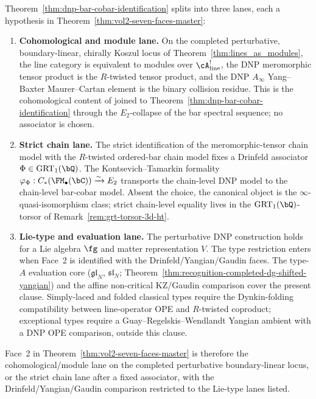 \begin{remark}
\label{rem:dnp-identification-lanes}
Theorem~\ref{thm:dnp-bar-cobar-identification} splits into three
lanes, each a hypothesis in
Theorem~\ref{thm:vol2-seven-faces-master}:
\begin{enumerate}[label=\textup{(\roman*)}]
\item \textbf{Cohomological and module lane.}
On the completed perturbative, boundary-linear, chirally Koszul
locus of Theorem~\ref{thm:lines_as_modules}, the line category is
equivalent to modules over $\cA^!_{\mathrm{line}}$, the DNP
meromorphic tensor product is the $R$-twisted tensor product, and
the DNP $A_\infty$ Yang--Baxter Maurer--Cartan element is the
binary collision residue. This is the cohomological content of
\cite[Thm.\,4.1, Thm.\,5.5, Thm.\,6.1]{DNP25} joined to
Theorem~\ref{thm:dnp-bar-cobar-identification} through the
$E_2$-collapse of the bar spectral sequence; no associator is
chosen.
\item \textbf{Strict chain lane.}
The strict identification of the meromorphic-tensor chain model
\cite{DNP25} with the $R$-twisted ordered-bar chain model fixes a
Drinfeld associator $\Phi\in\mathrm{GRT}_1(\bQ)$. The
Kontsevich--Tamarkin formality
$\varphi_\Phi : C_*(\FM_\bullet(\bC)) \xrightarrow{\sim} E_2$
transports the chain-level DNP model to the chain-level bar-cobar
model. Absent the choice, the canonical object is the
$\infty$-quasi-isomorphism class; strict chain-level equality lives
in the $\mathrm{GRT}_1(\bQ)$-torsor of
Remark~\ref{rem:grt-torsor-3d-ht}.
\item \textbf{Lie-type and evaluation lane.}
The perturbative DNP construction holds for a Lie algebra $\fg$
and matter representation $V$. The type restriction enters when
Face~2 is identified with the Drinfeld/Yangian/Gaudin faces. The
type-$A$ evaluation core
($\mathfrak{gl}_N$, $\mathfrak{sl}_N$;
Theorem~\ref{thm:recognition-completed-dg-shifted-yangian}) and
the affine non-critical KZ/Gaudin comparison cover the present
clause. Simply-laced and folded classical types require the
Dynkin-folding compatibility between line-operator OPE and
$R$-twisted coproduct; exceptional types require a
Guay--Regelskis--Wendlandt Yangian ambient \cite{GRW18} with a DNP
OPE comparison, outside this clause.
\end{enumerate}
Face~2 in Theorem~\ref{thm:vol2-seven-faces-master} is therefore
the cohomological/module lane on the completed perturbative
boundary-linear locus, or the strict chain lane after a fixed
associator, with the Drinfeld/Yangian/Gaudin comparison restricted
to the Lie-type lanes listed.
\end{remark}

